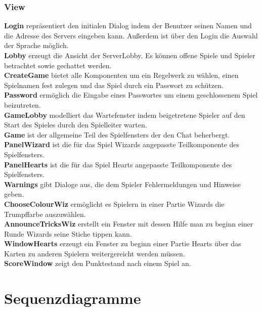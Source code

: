 \documentclass{article}
\begin{document}
	\subsubsection{View}
			\textbf{Login} repräsentiert den initialen Dialog indem der Benutzer seinen Namen und die Adresse des Servers eingeben kann. Außerdem ist über den Login die Auswahl der Sprache möglich.\\
			\textbf{Lobby} erzeugt die Ansicht der ServerLobby. Es können offene Spiele und Spieler betrachtet sowie gechattet werden. \\
			\textbf{CreateGame} bietet alle Komponenten um ein Regelwerk zu wählen, einen Spielnamen fest zulegen und das Spiel durch ein Passwort zu schützen. \\
			\textbf{Password} ermöglich die Eingabe eines Passwortes um einem geschlossenem Spiel beizutreten. \\
			\textbf{GameLobby} modelliert das Wartefenster indem beigetretene Spieler auf den Start des Spieles durch den Spielleiter warten. \\
			\textbf{Game} ist der allgemeine Teil des Spielfensters der den Chat beherbergt. \\
			\textbf{PanelWizard} ist die für das Spiel Wizards angepasste Teilkomponente des Spielfensters. \\
			\textbf{PanelHearts} ist die für das Spiel Hearts angepasste Teilkomponente des Spielfensters. \\
			\textbf{Warnings} gibt Dialoge aus, die dem Spieler Fehlermeldungen und Hinweise geben. \\
			\textbf{ChooseColourWiz} ermöglicht es Spielern in einer Partie Wizards die Trumpffarbe auszuwählen. \\
			\textbf{AnnounceTricksWiz} erstellt ein Fenster mit dessen Hilfe man zu beginn einer Runde Wizards seine Stiche tippen kann. \\
			\textbf{WindowHearts} erzeugt ein Fenster zu beginn einer Partie Hearts über das Karten zu anderen Spielern weitergereicht werden müssen. \\
			\textbf{ScoreWindow} zeigt den Punktestand nach einem Spiel an.\\

\section{Sequenzdiagramme}
\end{document}
